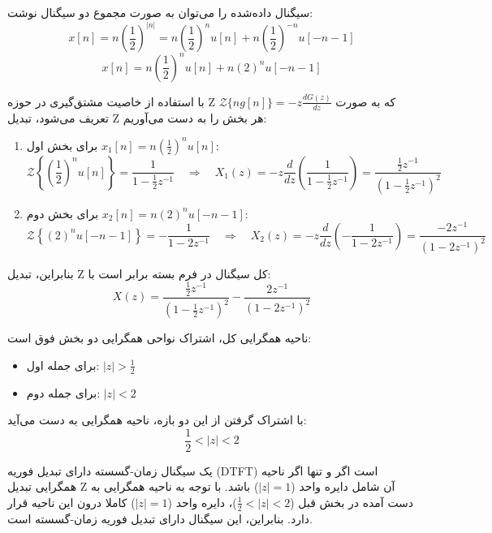 
سیگنال داده‌شده را می‌توان به صورت مجموع دو سیگنال نوشت:
\[
x[n] = n \left(\frac{1}{2}\right)^{|n|} = n \left(\frac{1}{2}\right)^n u[n] + n \left(\frac{1}{2}\right)^{-n} u[-n-1]
\]
\[
x[n] = n \left(\frac{1}{2}\right)^n u[n] + n (2)^n u[-n-1]
\]

با استفاده از خاصیت مشتق‌گیری در حوزه Z که به صورت $\mathcal{Z}\{n g[n]\} = -z \frac{dG(z)}{dz}$ تعریف می‌شود، تبدیل Z هر بخش را به دست می‌آوریم:
\begin{enumerate}
    \item برای بخش اول $x_1[n] = n \left(\frac{1}{2}\right)^n u[n]$:
    \[
    \mathcal{Z}\left\{\left(\frac{1}{2}\right)^n u[n]\right\} = \frac{1}{1 - \frac{1}{2}z^{-1}} \quad \Rightarrow \quad X_1(z) = -z \frac{d}{dz} \left( \frac{1}{1 - \frac{1}{2}z^{-1}} \right) = \frac{\frac{1}{2}z^{-1}}{\left(1 - \frac{1}{2}z^{-1}\right)^2}
    \]
    
    \item برای بخش دوم $x_2[n] = n (2)^n u[-n-1]$:
    \[
    \mathcal{Z}\left\{(2)^n u[-n-1]\right\} = -\frac{1}{1 - 2z^{-1}} \quad \Rightarrow \quad X_2(z) = -z \frac{d}{dz} \left( -\frac{1}{1 - 2z^{-1}} \right) = \frac{-2z^{-1}}{\left(1 - 2z^{-1}\right)^2}
    \]
\end{enumerate}

بنابراین، تبدیل Z کل سیگنال در فرم بسته برابر است با:
\[
X(z) = \frac{\frac{1}{2}z^{-1}}{\left(1 - \frac{1}{2}z^{-1}\right)^2} - \frac{2z^{-1}}{\left(1 - 2z^{-1}\right)^2}
\]


ناحیه همگرایی کل، اشتراک نواحی همگرایی دو بخش فوق است:
\begin{itemize}
    \item برای جمله اول: $|z| > \frac{1}{2}$
    \item برای جمله دوم: $|z| < 2$
\end{itemize}
با اشتراک گرفتن از این دو بازه، ناحیه همگرایی به دست می‌آید:
\[
\frac{1}{2} < |z| < 2
\]


یک سیگنال زمان-گسسته دارای تبدیل فوریه (DTFT) است اگر و تنها اگر ناحیه همگرایی تبدیل Z آن شامل دایره واحد ($|z| = 1$) باشد.
\newline
با توجه به ناحیه همگرایی به دست آمده در بخش قبل ($\frac{1}{2} < |z| < 2$)، دایره واحد ($|z| = 1$) کاملا درون این ناحیه قرار دارد. بنابراین، این سیگنال {دارای تبدیل فوریه زمان-گسسته است}.
